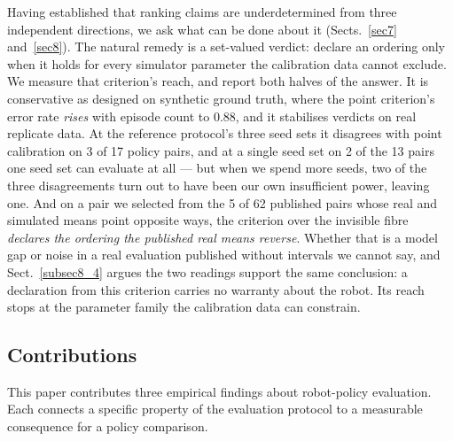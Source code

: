 \documentclass[pdflatex,iicol,sn-apa]{sn-jnl}
\theoremstyle{remark}
\begin{document}
Having established that ranking claims are underdetermined from three independent directions, we ask
what can be done about it (Sects.~\ref{sec7} and~\ref{sec8}). The natural remedy is a set-valued
verdict: declare an ordering only when it holds for every simulator parameter the calibration data
cannot exclude. We measure that criterion's reach, and report both halves of the answer. It is
conservative as designed on synthetic ground truth, where the point criterion's error rate
\emph{rises} with episode count to 0.88, and it stabilises verdicts on real replicate data. At the
reference protocol's three seed sets it disagrees with point calibration on 3 of 17 policy pairs, and
at a single seed set on 2 of the 13 pairs one seed set can evaluate at all --- but when we spend more
seeds, two of the three disagreements turn out to have been our own insufficient power, leaving
one. And on a pair we selected from the 5 of 62 published pairs whose real and simulated means point
opposite ways, the criterion over the invisible fibre \emph{declares the ordering the published real
means reverse}. Whether that is a model gap or noise in a real evaluation published without
intervals we cannot say, and Sect.~\ref{subsec8_4} argues the two readings support the same
conclusion: a declaration from this criterion carries no warranty about the robot. Its reach stops
at the parameter family the calibration data can constrain.

\subsection{Contributions}\label{subsec1_1}

This paper contributes three empirical findings about robot-policy evaluation. Each connects a
specific property of the evaluation protocol to a measurable consequence for a policy comparison.
\end{document}
